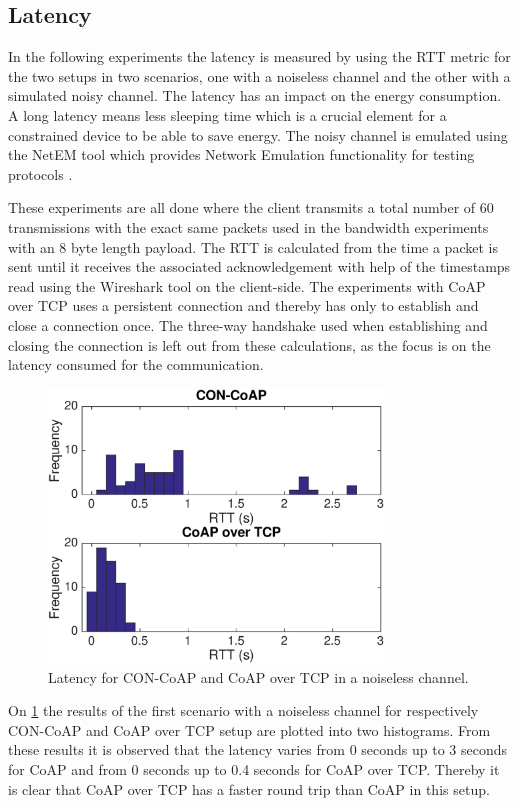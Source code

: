 \subsection{Latency}
In the following experiments the latency is measured by using the RTT metric for the two setups in two scenarios, one with a noiseless channel and the other with a simulated noisy channel. The latency has an impact on the energy consumption. A long latency means less sleeping time which is a crucial element for a constrained device to be able to save energy. 
The noisy channel is emulated using the NetEM tool which provides Network Emulation functionality for testing protocols \cite{netem19:online}. 

These experiments are all done where the client transmits a total number of 60 transmissions with the exact same packets used in the bandwidth experiments with an 8 byte length payload. The RTT is calculated from the time a packet is sent until it receives the associated acknowledgement with help of the timestamps read using the Wireshark tool on the client-side. 
The experiments with CoAP over TCP uses a persistent connection and thereby has only to establish and close a connection once. 
The three-way handshake used when establishing and closing the connection is left out from these calculations, as the focus is on the latency consumed for the communication. 

\begin{figure}[bht]
	\centering
	\includegraphics[width=3.5in]{gfx/latency-clean}
	\caption{Latency for CON-CoAP and CoAP over TCP in a noiseless channel.}
	\label{fig:latencynoiseless}
\end{figure}
On \figurename{\ref{fig:latencynoiseless}} the results of the first scenario with a noiseless channel for respectively CON-CoAP and CoAP over TCP setup are plotted into two histograms. 
From these results it is observed that the latency varies from 0 seconds up to 3 seconds for CoAP and from 0 seconds up to 0.4 seconds for CoAP over TCP. Thereby it is clear that CoAP over TCP has a faster round trip than CoAP in this setup. 

